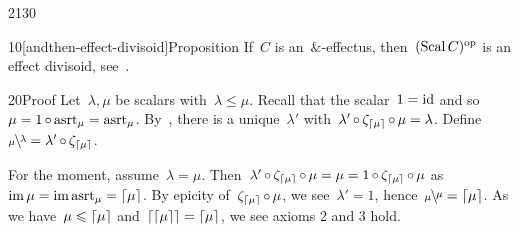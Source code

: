\begin{parsec}{2130}%
\begin{point}{10}[andthen-effect-divisoid]{Proposition}%
If~$C$ is an~$\&$-effectus,
    then~$(\operatorname{Scal} C)^{\mathrm{op}}$ is an effect divisoid,
    see~.
\begin{point}{20}{Proof}%
Let~$\lambda,\mu$ be scalars with~$\lambda \leq \mu$.
Recall that the scalar~$1=\mathrm{id}$
    and so~$\mu = 1 \mathop{\circ} \mathrm{asrt}_\mu = \mathrm{asrt}_\mu$.
By~,
    there is a unique~$\lambda'$
    with~$\lambda' \mathop{\circ} \zeta_{\left\lceil\mu\right\rceil} \mathop{\circ} \mu = \lambda$.
Define~$\rfrac{\lambda}{\mu} = \lambda'  \after \zeta_{\ceil{\mu}}$.

For the moment, assume~$\lambda = \mu$.
Then~$\lambda' \mathop{\circ} \zeta_{\left\lceil\mu\right\rceil} \mathop{\circ} \mu
            = \mu = 1 \mathop{\circ} \zeta_{\left\lceil\mu\right\rceil} \mathop{\circ} \mu$
            as~$\operatorname{im} \mu = \operatorname{im} \mathrm{asrt}_{\mu} = \left\lceil\mu\right\rceil$.
        By epicity of~$\zeta_{\left\lceil\mu\right\rceil} \mathop{\circ} \mu$,
            we see~$\lambda' = 1$, hence~$\rfrac{\mu}{\mu}=\ceil{\mu}$.
As we have~$\mu \leqslant \left\lceil\mu\right\rceil$ and~$\left\lceil\left\lceil\mu\right\rceil\right\rceil = \left\lceil\mu\right\rceil$,
    we see axioms 2 and 3 hold.


\end{point}
\end{point}
\end{parsec}
